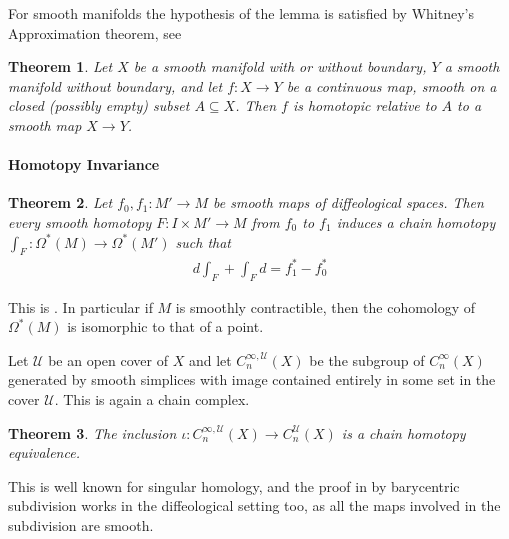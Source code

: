 \documentclass{scrartcl}
\theoremstyle{plain}
\newtheorem{theorem}{Theorem}[section]
\theoremstyle{definition}
\renewcommand{\subset}{\subseteq}
\begin{document}
For smooth manifolds the hypothesis of the lemma is satisfied by Whitney's Approximation theorem, see \cite[Theorem 6.26]{lee2003introduction}
\begin{theorem}
    Let $X$ be a smooth manifold with or without boundary, $Y$ a smooth manifold without boundary, and let $f\colon X\to Y$ be a continuous map, smooth on a closed (possibly empty) subset $A\subset X$. Then $f$ is homotopic relative to $A$ to a smooth map $X\to Y$.
\end{theorem}

\paragraph{Homotopy Invariance}
\begin{theorem}
    Let $f_0, f_1\colon M'\to M$ be smooth maps of diffeological spaces. Then every smooth homotopy $F\colon I\times M'\to M$ from $f_0$ to $f_1$ induces a chain homotopy $\int_F\colon \Omega^*(M)\to \Omega^*(M')$ such that 
    \begin{align*}
        d\int_F + \int_F d = f_1^* - f_0^*
    \end{align*}
\end{theorem}
This is \cite[Lemma 1.4.1]{chen1977iterated}. In particular if $M$ is smoothly contractible, then the cohomology of $\Omega^*(M)$ is isomorphic to that of a point.

Let $\mathcal U$ be an open cover of $X$ and let $C_n^{\infty,\mathcal U}(X)$ be the subgroup of $C_n^\infty(X)$ generated by smooth simplices with image contained entirely in some set in the cover $\mathcal U$. This is again a chain complex.
\begin{theorem}
    The inclusion $\iota\colon C_n^{\infty,\mathcal U}(X) \to C_n^{\mathcal U}(X)$ is a chain homotopy equivalence.
\end{theorem}
This is well known for singular homology, and the proof in \cite{hatcher2002algebraic} by barycentric subdivision works in the diffeological setting too, as all the maps involved in the subdivision are smooth.
\end{document}
